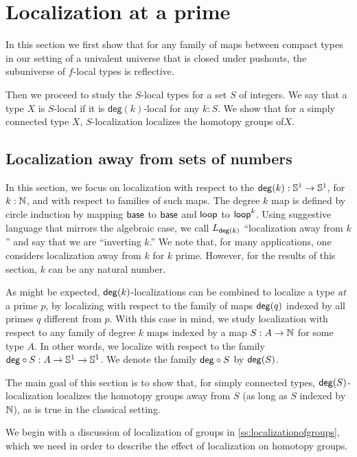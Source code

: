\chapter{Localization at a prime}

In this section we first show that for any family of maps between compact types in our setting of a univalent universe that is closed under pushouts, the subuniverse of $f$-local types is reflective. 

Then we proceed to study the $S$-local types for a set $S$ of integers. We say that a type $X$ is $S$-local if it is $\mathsf{deg}(k)$-local for any $k:S$. We show that for a simply connected type $X$, $S$-localization localizes the homotopy groups of$X$. 

\section{Localization away from sets of numbers}\label{section:localizationaway}

In this section, we focus on localization with respect to the  $\mathsf{deg}(k) : \mathbb{S}^{1} \to \mathbb{S}^{1}$, for $k : \mathbb{N}$, and with respect to
families of such maps.
The degree $k$ map is defined by circle induction by mapping $\mathsf{base}$ to $\mathsf{base}$
and $\mathsf{loop}$ to $\mathsf{loop}^k$.
Using suggestive language that mirrors the algebraic case, we call $L_{\mathsf{deg}(k)}$
``localization away from $k$'' and say that we are ``inverting $k$.''
We note that, for many applications, one considers localization away from $k$ for $k$ prime.
However, for the results of this section, $k$ can be any natural number.

As might be expected, $\mathsf{deg}(k)$-localizations can be combined to localize a type \emph{at}
a prime $p$, by localizing with respect to the family of maps $\mathsf{deg}(q)$ indexed by all
primes $q$ different from $p$.
With this case in mind, we study localization with respect to any family of degree $k$ maps
indexed by a map $S : A \to \mathbb{N}$ for some type $A$.
In other words, we localize with respect to the family $\mathsf{deg}\circ S : A \to \mathbb{S}^{1} \to \mathbb{S}^{1}$.
We denote the family $\mathsf{deg}\circ S$ by $\mathsf{deg}(S)$.

The main goal of this section is to show that, for simply connected types,
$\mathsf{deg}(S)$-localization localizes the homotopy groups away from $S$ (as long as $S$ indexed by $\mathbb{N}$),
as is true in the classical setting.

We begin with a discussion of localization of groups in \cref{ss:localizationofgroups}, which we need in order to describe the effect of localization on homotopy groups.

